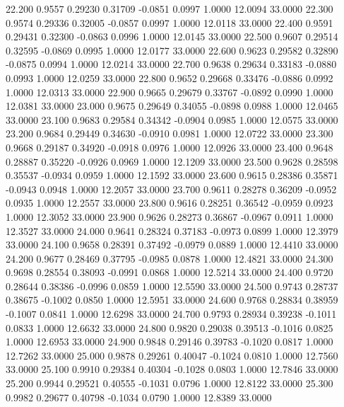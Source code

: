   22.200   0.9557   0.29230   0.31709  -0.0851   0.0997   1.0000  12.0094  33.0000
  22.300   0.9574   0.29336   0.32005  -0.0857   0.0997   1.0000  12.0118  33.0000
  22.400   0.9591   0.29431   0.32300  -0.0863   0.0996   1.0000  12.0145  33.0000
  22.500   0.9607   0.29514   0.32595  -0.0869   0.0995   1.0000  12.0177  33.0000
  22.600   0.9623   0.29582   0.32890  -0.0875   0.0994   1.0000  12.0214  33.0000
  22.700   0.9638   0.29634   0.33183  -0.0880   0.0993   1.0000  12.0259  33.0000
  22.800   0.9652   0.29668   0.33476  -0.0886   0.0992   1.0000  12.0313  33.0000
  22.900   0.9665   0.29679   0.33767  -0.0892   0.0990   1.0000  12.0381  33.0000
  23.000   0.9675   0.29649   0.34055  -0.0898   0.0988   1.0000  12.0465  33.0000
  23.100   0.9683   0.29584   0.34342  -0.0904   0.0985   1.0000  12.0575  33.0000
  23.200   0.9684   0.29449   0.34630  -0.0910   0.0981   1.0000  12.0722  33.0000
  23.300   0.9668   0.29187   0.34920  -0.0918   0.0976   1.0000  12.0926  33.0000
  23.400   0.9648   0.28887   0.35220  -0.0926   0.0969   1.0000  12.1209  33.0000
  23.500   0.9628   0.28598   0.35537  -0.0934   0.0959   1.0000  12.1592  33.0000
  23.600   0.9615   0.28386   0.35871  -0.0943   0.0948   1.0000  12.2057  33.0000
  23.700   0.9611   0.28278   0.36209  -0.0952   0.0935   1.0000  12.2557  33.0000
  23.800   0.9616   0.28251   0.36542  -0.0959   0.0923   1.0000  12.3052  33.0000
  23.900   0.9626   0.28273   0.36867  -0.0967   0.0911   1.0000  12.3527  33.0000
  24.000   0.9641   0.28324   0.37183  -0.0973   0.0899   1.0000  12.3979  33.0000
  24.100   0.9658   0.28391   0.37492  -0.0979   0.0889   1.0000  12.4410  33.0000
  24.200   0.9677   0.28469   0.37795  -0.0985   0.0878   1.0000  12.4821  33.0000
  24.300   0.9698   0.28554   0.38093  -0.0991   0.0868   1.0000  12.5214  33.0000
  24.400   0.9720   0.28644   0.38386  -0.0996   0.0859   1.0000  12.5590  33.0000
  24.500   0.9743   0.28737   0.38675  -0.1002   0.0850   1.0000  12.5951  33.0000
  24.600   0.9768   0.28834   0.38959  -0.1007   0.0841   1.0000  12.6298  33.0000
  24.700   0.9793   0.28934   0.39238  -0.1011   0.0833   1.0000  12.6632  33.0000
  24.800   0.9820   0.29038   0.39513  -0.1016   0.0825   1.0000  12.6953  33.0000
  24.900   0.9848   0.29146   0.39783  -0.1020   0.0817   1.0000  12.7262  33.0000
  25.000   0.9878   0.29261   0.40047  -0.1024   0.0810   1.0000  12.7560  33.0000
  25.100   0.9910   0.29384   0.40304  -0.1028   0.0803   1.0000  12.7846  33.0000
  25.200   0.9944   0.29521   0.40555  -0.1031   0.0796   1.0000  12.8122  33.0000
  25.300   0.9982   0.29677   0.40798  -0.1034   0.0790   1.0000  12.8389  33.0000
